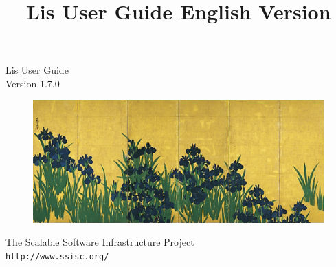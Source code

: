 \documentclass[a4paper]{article}
\title{Lis User Guide English Version}
\author{}
\date{}
\begin{document}
\vspace*{4cm}
\begin{flushleft}
{\Large Lis User Guide}\\
Version 1.7.0
\end{flushleft}

\vspace*{2cm}
\begin{figure}[h]
\includegraphics[scale=0.7]{irises_korin.eps}
\end{figure}

\vspace*{2cm}
\begin{flushleft}
{\large The Scalable Software Infrastructure
Project\\
{\tt http://www.ssisc.org/}}\\
\end{flushleft}

\vspace*{5mm}
\thispagestyle{empty}
\end{document}

